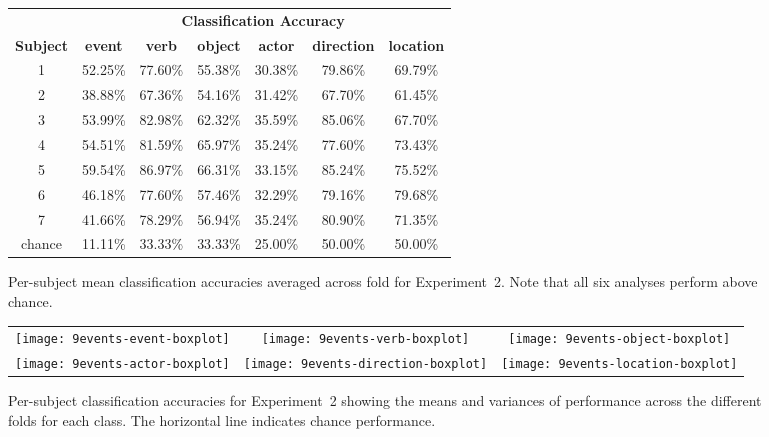 \begin{figure}
  \centering
  \begin{tabular}[b]{ccccccc}
    \toprule
    &\multicolumn{6}{c}{\textbf{Classification Accuracy}}\\
    \cmidrule(l){2-7}
    \textbf{Subject}
    &\textbf{event}&\textbf{verb}&\textbf{object}&\textbf{actor}&
    \textbf{direction}&\textbf{location}\\
    \cmidrule{1-1}
    \cmidrule(l){2-7}
    1&52.25\%&77.60\%&55.38\%&30.38\%&79.86\%&69.79\%\\
    2&38.88\%&67.36\%&54.16\%&31.42\%&67.70\%&61.45\%\\
    3&53.99\%&82.98\%&62.32\%&35.59\%&85.06\%&67.70\%\\
    4&54.51\%&81.59\%&65.97\%&35.24\%&77.60\%&73.43\%\\
    5&59.54\%&86.97\%&66.31\%&33.15\%&85.24\%&75.52\%\\
    6&46.18\%&77.60\%&57.46\%&32.29\%&79.16\%&79.68\%\\
    7&41.66\%&78.29\%&56.94\%&35.24\%&80.90\%&71.35\%\\[0.4ex]
    chance&11.11\%&33.33\%&33.33\%&25.00\%&50.00\%&50.00\%\\\bottomrule
  \end{tabular}
  \caption{Per-subject mean classification accuracies
    averaged across fold for Experiment~2.
    Note that all six analyses perform above chance.}
  \label{fig:9events-results}
\end{figure}

\begin{landscape}
  \begin{figure}
    \centering
    \begin{tabular}{ccc}
      \texttt{[image: 9events-event-boxplot]}&
      \texttt{[image: 9events-verb-boxplot]}&
      \texttt{[image: 9events-object-boxplot]}\\
      \texttt{[image: 9events-actor-boxplot]}&
      \texttt{[image: 9events-direction-boxplot]}&
      \texttt{[image: 9events-location-boxplot]}\\
    \end{tabular}
    \caption{Per-subject classification accuracies for Experiment~2 showing
      the means and variances of performance across the different folds
      for each class.
      The horizontal line indicates chance performance.}
    \label{fig:9events-results2}
  \end{figure}
\end{landscape}

